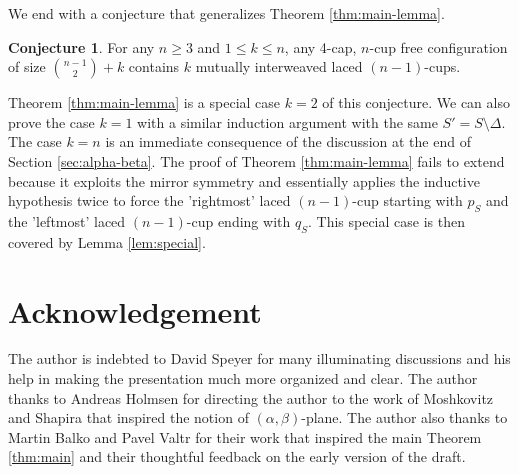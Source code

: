 \documentclass{amsart}
\theoremstyle{definition}
\newtheorem{conjecture}{Conjecture}
\numberwithin{thm}{section}
\begin{document}
We end with a conjecture that generalizes Theorem \ref{thm:main-lemma}.
\begin{conjecture}
\label{conj:interweaved}
For any $n \geq 3$ and $1 \leq k \leq n$, any 4-cap, $n$-cup free configuration of size $\binom{n-1}{2}+k$ contains $k$ mutually interweaved laced $(n-1)$-cups.
\end{conjecture}
Theorem \ref{thm:main-lemma} is a special case $k=2$ of this conjecture. We can also prove the case $k=1$ with a similar induction argument with the same $S' = S \setminus \Delta$.
The case $k = n$ is an immediate consequence of the discussion at the end of Section \ref{sec:alpha-beta}.
The proof of Theorem \ref{thm:main-lemma} fails to extend because it exploits the mirror symmetry and essentially applies the inductive hypothesis twice to force the 'rightmost' laced $(n-1)$-cup starting with $p_S$ and the 'leftmost' laced $(n-1)$-cup ending with $q_S$.
This special case is then covered by Lemma \ref{lem:special}.

\section*{Acknowledgement}
The author is indebted to David Speyer for many illuminating discussions and his help in making the presentation much more organized and clear.
The author thanks to Andreas Holmsen for directing the author to the work of Moshkovitz and Shapira \cite{moshkovitz2014ramsey} that inspired the notion of $(\alpha, \beta)$-plane. 
The author also thanks to Martin Balko and Pavel Valtr for their work \cite{balko2017sat} that inspired the main Theorem \ref{thm:main} and their thoughtful feedback on the early version of the draft.


\end{document}
